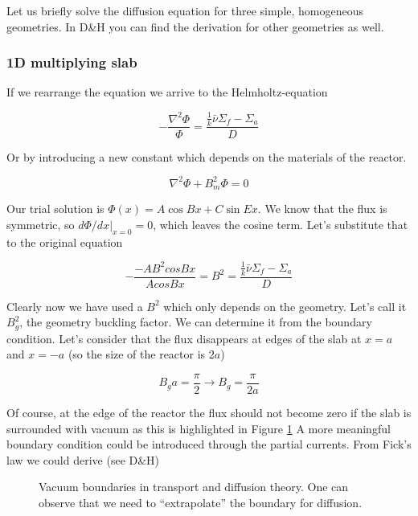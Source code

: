 Let us briefly solve the diffusion equation for three simple, homogeneous geometries. In D\&H you can find the derivation for other geometries as well.

\subsubsection*{1D multiplying slab}

If we rearrange the equation we arrive to the Helmholtz-equation

\begin{equation}
-\frac{\nabla^2 \Phi}{\Phi}=\frac{\frac{1}{k}\bar\nu\Sigma_f-\Sigma_a}{D}
\end{equation}

Or by introducing a new constant which depends on the materials of the reactor.

\begin{equation}
\nabla^2 \Phi+B_m^2\Phi=0
\end{equation}

Our trial solution is $\Phi(x)=A\cos Bx+C\sin Ex$. We know that the flux is symmetric, so  $d\Phi/dx|_{x=0}=0$, which leaves the cosine term. Let's substitute that to the original equation

\begin{equation}
-\frac{-AB^2cosBx}{AcosBx}=B^2=\frac{\frac{1}{k}\bar\nu\Sigma_f-\Sigma_a}{D}
\end{equation}

Clearly now we have used a $B^2$ which only depends on the geometry. Let's call it $B_g^2$, the geometry buckling factor. We can determine it from the boundary condition. Let's consider that the flux disappears at edges of the slab at $x=a$ and $x=-a$ (so the size of the reactor is $2a$)

\[
B_ga=\frac{\pi}{2} \rightarrow B_g=\frac{\pi}{2a}
\]

Of course, at the edge of the reactor the flux should not become zero if the slab is surrounded with vacuum as this is highlighted in Figure \ref{fig:boundary} A more meaningful boundary condition could be introduced through the partial currents. From Fick's law we could derive (see D\&H)

\begin{figure}[ht!]
\protect {}\protect
\caption{\label{fig:boundary} \footnotesize{Vacuum boundaries in transport and diffusion theory. One can observe that we need to ``extrapolate'' the boundary for diffusion.}}
\end{figure} 


